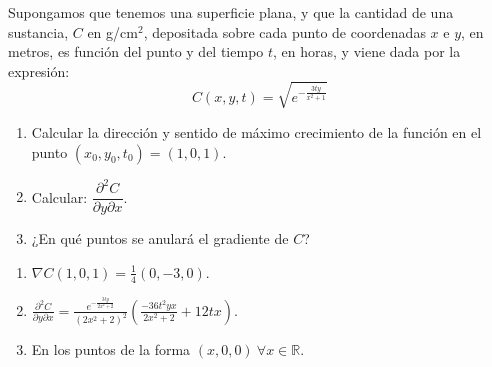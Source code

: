 {Supongamos que tenemos una superficie plana, y que la cantidad de una sustancia, $C$ en g/cm$^2$,
depositada sobre cada punto de coordenadas $x$ e $y$, en metros, es función del punto y del tiempo $t$, en horas, y
viene dada por la expresión:
\[
C(x,y,t) = \sqrt{e^{-\frac{3ty}{x^2+1}}}
\]
\begin{enumerate}
\item Calcular la dirección y sentido de máximo crecimiento de la
función en el punto $(x_0,y_0,t_0)=(1,0,1)$.
\item Calcular: $\dfrac{{\partial ^2 C}}{{\partial y\partial x}}$.
\item ¿En qué puntos se anulará el gradiente de $C$?
\end{enumerate}
}
{\begin{enumerate}
\item $\nabla C(1,0,1) =\frac{1}{4}(0,-3,0)$.
\item $\displaystyle \frac{\partial^2 C}{\partial y\partial x} =
\frac{e^{-\frac{3ty}{2x^2+2}}}{(2x^2+2)^2}\left(\frac{-36t^2yx}{2x^2+2}+12tx\right)$.
\item En los puntos de la forma $(x,0,0)\ \forall x\in \mathbb{R}$.
\end{enumerate}
}
